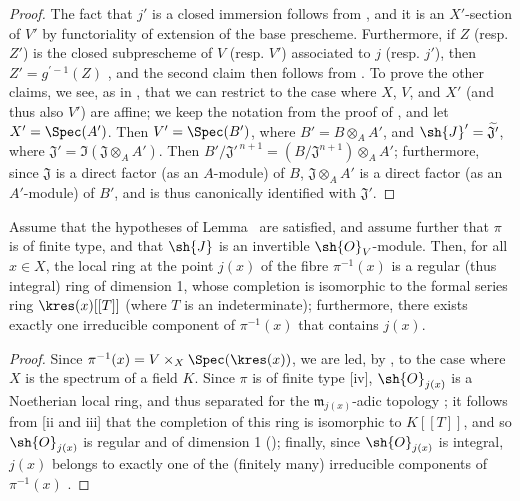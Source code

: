 \begin{proof}
The fact that $j'$ is a closed immersion follows from , and it is an $X'$-section of $V'$ by functoriality of extension of the base prescheme.
Furthermore, if $Z$ (resp. $Z'$) is the closed subprescheme of $V$ (resp. $V'$) associated to $j$ (resp. $j'$), then $Z'=g^{'-1}(Z)$ , and the second claim then follows from .
To prove the other claims, we see, as in , that we can restrict to the case where $X$, $V$, and $X'$ (and thus also $V'$) are affine;
we keep the notation from the proof of , and let $X'=\Spec(A')$.
Then $V'=\Spec(B')$, where $B'=B\otimes_A A'$, and $\sh{J}'=\widetilde{\mathfrak{J}'}$, where $\mathfrak{J}'=\Im(\mathfrak{J}\otimes_A A')$.
Then $B'/\mathfrak{J}'^{\,n+1}=(B/\mathfrak{J}^{n+1})\otimes_A A'$;
furthermore, since $\mathfrak{J}$ is a direct factor (as an $A$-module) of $B$, $\mathfrak{J}\otimes_A A'$ is a direct factor (as an $A'$-module) of $B'$, and is thus canonically identified with $\mathfrak{J}'$.
\end{proof}

\begin{corollary}[8.10.3]
\label{II.8.10.3}
Assume that the hypotheses of Lemma~ are satisfied, and assume further that $\pi$ is of finite type, and that $\sh{J}$ is an invertible $\sh{O}_V$-module.
Then, for all $x\in X$, the local ring at the point $j(x)$ of the fibre $\pi^{-1}(x)$ is a regular (thus integral) ring of dimension 1, whose completion is isomorphic to the formal series ring $\kres(x)[[T]]$ (where $T$ is an indeterminate);
furthermore, there exists exactly one irreducible component of $\pi^{-1}(x)$ that contains $j(x)$.
\end{corollary}

\begin{proof}
Since $\pi^{-1}(x)=V\times_X\Spec(\kres(x))$, we are led, by , to the case where $X$ is the spectrum of a field $K$.
Since $\pi$ is of finite type [iv], $\sh{O}_{j(x)}$ is a Noetherian local ring, and thus separated for the $\mathfrak{m}_{j(x)}$-adic topology ;
it follows from [ii and iii] that the completion of this ring is isomorphic to $K[[T]]$, and so $\sh{O}_{j(x)}$ is regular and of dimension 1 (\cite[p.~17-01, th.~1]{I-1});
finally, since $\sh{O}_{j(x)}$ is integral, $j(x)$ belongs to exactly one of the (finitely many) irreducible components of $\pi^{-1}(x)$ .
\end{proof}

